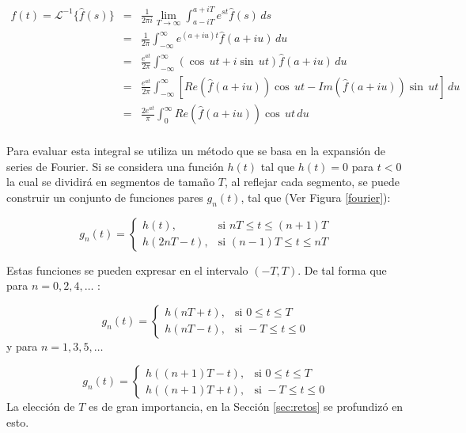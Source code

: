 \documentclass[11pt]{article}
\numberwithin{equation}{section} %
\begin{document}
\[
\begin{array}{rcl}
f(t) = \mathcal{L}^{-1} \{\hat{f}(s)\} & = & \displaystyle \frac{1}{2 \pi i} \lim_{T\to\infty}\int_{ a - i T}^{ a + i T} e^{st} \hat{f}(s)\,ds\\
& = & \displaystyle \frac{1}{2 \pi} \int_{ -\infty}^{ \infty} e^{(a+iu)t} \hat{f}(a+iu)\,du\\
& = & \displaystyle \frac{e^{at}}{2 \pi} \int_{ -\infty}^{ \infty} (\cos\,ut + i \sin\,ut)\hat{f}(a+iu)\,du\\
& = & \displaystyle \frac{e^{at}}{2 \pi} \int_{ -\infty}^{ \infty} \left[Re(\hat{f}(a+iu))\cos\,ut - Im(\hat{f}(a+iu))\sin\,ut\right]\,du\\
& = & \displaystyle \frac{2e^{at}}{\pi} \int_{0}^{ \infty} Re(\hat{f}(a+iu))\cos\,ut\,du\\
\end{array}
\]

Para evaluar esta integral se utiliza un método \cite{dubner1968} que se basa en la expansión de series de Fourier. Si se considera una función $h(t)$ tal que $h(t)=0$ para $t<0$ la cual se dividirá en segmentos de tamaño $T$, al reflejar cada segmento, se puede construir un conjunto de funciones pares $g_n(t)$, tal que (Ver Figura \ref{fourier}):

\[
g_n(t) =
\begin{cases}
h(t), & \mbox{si } nT\leq t \leq (n+1)T \\
h(2nT-t), & \mbox{si } (n-1)T \leq t \leq nT
\end{cases}
\]

Estas funciones se pueden expresar en el intervalo $(-T,T)$. De tal forma que para $n=0,2,4,\ldots$ :

\[
g_n(t) =
\begin{cases}
h(nT+t), & \mbox{si } 0 \leq t \leq T \\
h(nT-t), & \mbox{si } -T \leq t \leq 0
\end{cases}
\]
y para $n=1,3,5,\ldots$

\[
g_n(t) =
\begin{cases}
h((n+1)T-t), & \mbox{si } 0 \leq t \leq T \\
h((n+1)T+t), & \mbox{si } -T \leq t \leq 0
\end{cases}
\]
La elección de $T$ es de gran importancia, en la Sección \ref{sec:retos} se profundizó en esto.\\
\end{document}
